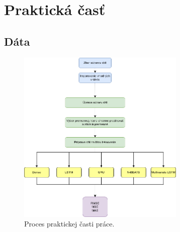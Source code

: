 \section{Praktická časť}

\subsection{Dáta}



\begin{figure}[!htbp]
  \centering
  \includegraphics[width=8cm]{img/multivariate LSTM Diagram.drawio.png}
  \caption{Proces praktickej časti práce.}
  \label{workflow}
\end{figure}

